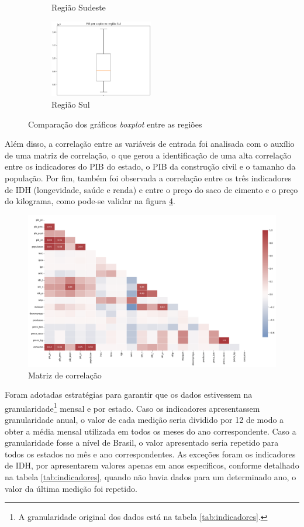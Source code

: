 \begin{figure}[H]
\begin{subfigure}{5cm}
        \caption{Região Sudeste}
        \label{fig:boxplot-se}
    \end{subfigure}
    \begin{subfigure}{5cm}
        \centering 
        \includegraphics[width=4.5cm]{../figuras/graficos/boxplot-pib-cc-s.png}
        \caption{Região Sul}
        \label{fig:boxplot-s}
    \end{subfigure}
    \caption{Comparação dos gráficos \textit{boxplot} entre as regiões}
  \end{figure}

Além disso, a correlação entre as variáveis de entrada foi analisada com o auxílio 
de uma matriz de correlação, o que gerou a identificação de uma 
alta correlação entre os indicadores do PIB do estado, o PIB da construção
civil e o tamanho da população. Por fim, também foi observada a correlação entre os três indicadores
de IDH (longevidade, saúde e renda) e entre o preço do saco de cimento e o preço do kilograma, como pode-se
validar na figura \ref{fig:matriz-corr}.

\begin{figure}[H]
    \centering
    \includegraphics[width=13cm]{../figuras/graficos/matriz-corr.png}
    \caption{Matriz de correlação}
    \label{fig:matriz-corr}
\end{figure}

Foram adotadas estratégias para garantir que os dados estivessem na granularidade\footnote{A granularidade original dos dados está na tabela \ref{tab:indicadores}.}
mensal e por estado. Caso os indicadores apresentassem granularidade anual, o valor de
cada medição seria dividido por 12 de modo a obter a média mensal utilizada em 
todos os meses do ano correspondente. Caso a granularidade
fosse a nível de Brasil, o valor apresentado seria repetido para todos os 
estados no mês e ano correspondentes. As exceções foram os 
indicadores de IDH, por apresentarem valores apenas em anos específicos, conforme 
detalhado na tabela \ref{tab:indicadores}, quando não havia dados para um 
determinado ano, o valor da última medição foi repetido.

